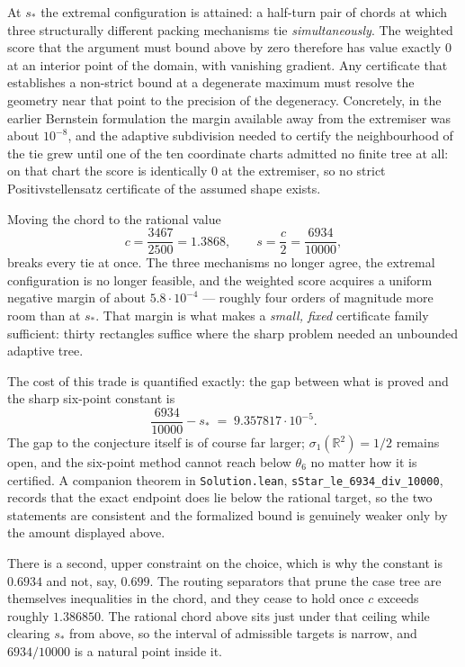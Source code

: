 \documentclass[11pt]{article}
\newcommand{\R}{\mathbb{R}}
\begin{document}
At $s_*$ the extremal configuration is attained: a half-turn pair of chords at which three
structurally different packing mechanisms tie \emph{simultaneously}. The weighted score that the
argument must bound above by zero therefore has value exactly $0$ at an interior point of the
domain, with vanishing gradient. Any certificate that establishes a non-strict bound at a
degenerate maximum must resolve the geometry near that point to the precision of the degeneracy.
Concretely, in the earlier Bernstein formulation the margin available away from the extremiser was
about $10^{-8}$, and the adaptive subdivision needed to certify the neighbourhood of the tie grew
until one of the ten coordinate charts admitted no finite tree at all: on that chart the score is
identically $0$ at the extremiser, so no strict Positivstellensatz certificate of the assumed shape
exists.

Moving the chord to the rational value
\[
c=\frac{3467}{2500}=1.3868,\qquad s=\frac c2=\frac{6934}{10000},
\]
breaks every tie at once. The three mechanisms no longer agree, the extremal configuration is no
longer feasible, and the weighted score acquires a uniform negative margin of about
$5.8\cdot10^{-4}$ — roughly four orders of magnitude more room than at $s_*$. That margin is what
makes a \emph{small, fixed} certificate family sufficient: thirty rectangles suffice where the
sharp problem needed an unbounded adaptive tree.

The cost of this trade is quantified exactly: the gap between what is proved and the sharp
six-point constant is
\[
\frac{6934}{10000}-s_*\;=\;9.357817\cdot10^{-5}.
\]
The gap to the conjecture itself is of course far larger; $\sigma_1(\R^2)=1/2$ remains open, and
the six-point method cannot reach below $\theta_6$ no matter how it is certified. A companion
theorem in \texttt{Solution.lean}, \texttt{sStar\_le\_6934\_div\_10000}, records that the exact
endpoint does lie below the rational target, so the two statements are consistent and the
formalized bound is genuinely weaker only by the amount displayed above.

\medskip
There is a second, upper constraint on the choice, which is why the constant is $0.6934$ and not,
say, $0.699$. The routing separators that prune the case tree are themselves inequalities in the
chord, and they cease to hold once $c$ exceeds roughly $1.386850$. The rational chord above sits
just under that ceiling while clearing $s_*$ from above, so the interval of admissible targets is
narrow, and $6934/10000$ is a natural point inside it.
\end{document}
